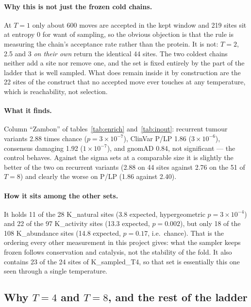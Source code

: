 \documentclass[11pt,a4paper]{article}
\begin{document}
\paragraph{Why this is not just the frozen cold chains.} At $T=1$ only about
600 moves are accepted in the kept window and 219 sites sit at entropy 0 for
want of sampling, so the obvious objection is that the rule is measuring the
chain's acceptance rate rather than the protein. It is not: $T=2$, 2.5 and 3
\emph{on their own} return the identical 44 sites. The two coldest chains
neither add a site nor remove one, and the set is fixed entirely by the part
of the ladder that is well sampled. What does remain inside it by
construction are the 22 sites of the construct that no accepted move ever
touches at any temperature, which is reachability, not selection.

\paragraph{What it finds.} Column ``Zambon'' of tables~\ref{tab:enrich}
and~\ref{tab:inout}: recurrent tumour variants 2.88 times chance
($p=3\times10^{-7}$), ClinVar P/LP 1.86 ($3\times10^{-6}$), consensus
damaging 1.92 ($1\times10^{-7}$), and gnomAD 0.84, not significant --- the
control behaves. Against the sigma sets at a comparable size it is slightly
the better of the two on recurrent variants (2.88 on 44 sites against 2.76 on
the 51 of $T=8$) and clearly the worse on P/LP (1.86 against 2.40).

\paragraph{How it sits among the other sets.} It holds 11 of the 28
K\_natural sites (3.8 expected, hypergeometric $p=3\times10^{-4}$) and 22 of
the 97 K\_activity sites (13.3 expected, $p=0.002$), but only 18 of the 108
K\_abundance sites (14.8 expected, $p=0.17$, i.e.\ chance). That is the
ordering every other measurement in this project gives: what the sampler
keeps frozen follows conservation and catalysis, not the stability of the
fold. It also contains 23 of the 24 sites of K\_sampled\_T4, so that set is
essentially this one seen through a single temperature.

\subsection{Why $T=4$ and $T=8$, and the rest of the ladder}\label{sec:allT}
\end{document}
